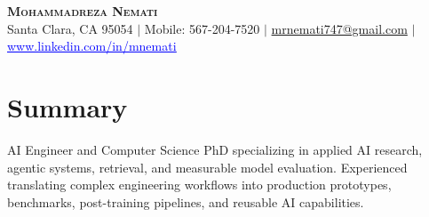 \documentclass[letterpaper,13pt]{article}
\begin{document}
\begin{center}
    \textbf{\LARGE \scshape Mohammadreza Nemati} \\ \vspace{1pt}
    \small Santa Clara, CA 95054 $|$ Mobile: 567-204-7520 $|$
    \href{mailto:mrnemati747@gmail.com}{mrnemati747@gmail.com} $|$
    \href{https://www.linkedin.com/in/mnemati/}{\textcolor{blue}{\underline{www.linkedin.com/in/mnemati}}}
\end{center}

\section{Summary}
\small{AI Engineer and Computer Science PhD specializing in applied AI research, agentic systems, retrieval, and measurable model evaluation. Experienced translating complex engineering workflows into production prototypes, benchmarks, post-training pipelines, and reusable AI capabilities.}
\vspace{0.05cm}
\end{document}
